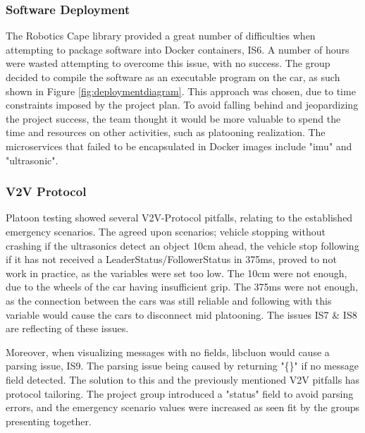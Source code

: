 \documentclass[12pt]{article}
\begin{document}
\subsubsection{Software Deployment}\label{deployment issues}
The Robotics Cape library\cite{robotics cape} provided a great number of difficulties when attempting to package software into Docker containers, IS6. A number of hours were wasted attempting to overcome this issue, with no success. The group decided to compile the software as an executable program on the car, as such shown in Figure \ref{fig:deploymentdiagram}. This approach was chosen, due to time constraints imposed by the project plan. To avoid falling behind and jeopardizing the project success, the team thought it would be more valuable to spend the time and resources on other activities, such as platooning realization. The microservices that failed to be encapsulated in Docker images include "imu" and "ultrasonic". \par

\subsubsection{V2V Protocol}
Platoon testing showed several V2V-Protocol pitfalls, relating to the established emergency scenarios. The agreed upon scenarios; vehicle stopping without crashing if the ultrasonics detect an object 10cm ahead, the vehicle stop following if it has not received a LeaderStatus/FollowerStatus in 375ms, proved to not work in practice, as the variables were set too low. The 10cm were not enough, due to the wheels of the car having insufficient grip. The 375ms were not enough, as the connection between the cars was still reliable and following with this variable would cause the cars to disconnect mid platooning. The issues IS7 \& IS8 are reflecting of these issues. \par

Moreover, when visualizing messages with no fields, libcluon would cause a parsing issue\cite{libcluon parse issue}, IS9. The parsing issue being caused by returning "\{\}" if no message field detected. The solution to this and the previously mentioned V2V pitfalls has protocol tailoring. The project group introduced a "status" field to avoid parsing errors, and the emergency scenario values were increased as seen fit by the groups presenting together. 
\pagebreak

\end{document}
